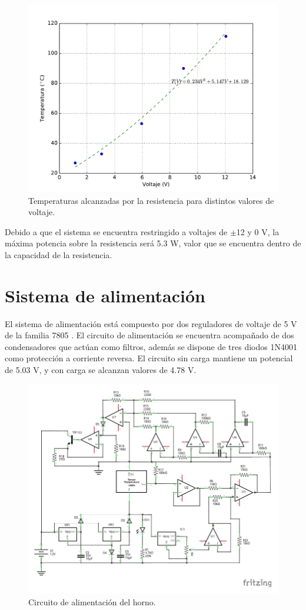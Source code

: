 \documentclass{wileysix}
\begin{document}
\begin{figure}[h]
	\centering
	\includegraphics[width=0.7\linewidth]{extras/actuator.pdf}
	\caption{Temperaturas alcanzadas por la resistencia para distintos valores de voltaje.}
\end{figure}
Debido a que el sistema se encuentra restringido a voltajes de $\pm$12 y 0 V, la m\'axima potencia sobre la resistencia ser\'a 5.3 W, valor que se encuentra dentro de la capacidad de la resistencia.

\section{Sistema de alimentaci\'on}
El sistema de alimentaci\'on est\'a compuesto por dos reguladores de voltaje de 5 V de la familia 7805 \cite{7805}. El circuito de alimentaci\'on se encuentra acompa\~nado de dos condensadores que act\'uan como filtros, adem\'as se dispone de tres diodos 1N4001 \cite{1N4001} como protecci\'on a corriente reversa. El circuito sin carga mantiene un potencial de 5.03 V, y con carga se alcanzan valores de 4.78 V.
\begin{figure}[h]
	\centering
	\includegraphics[width=0.9\linewidth]{extras/alimentacion.pdf}
	\caption{Circuito de alimentaci\'on del horno.}
\end{figure}
\end{document}
